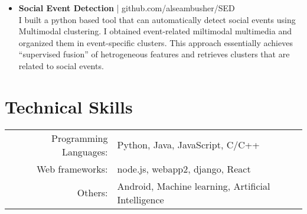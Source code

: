 \documentclass{article} %
\begin{document}
\begin{itemize}
 \item \textbf{Social Event Detection} | github.com/alseambusher/SED\\ 
 I built a python based tool that can automatically detect social events using Multimodal clustering. I obtained event-related miltimodal multimedia and organized them in event-specific clusters. This approach essentially achieves “supervised fusion” of hetrogeneous features and retrieves clusters that are related to social events.
\end{itemize}


\section{Technical Skills}
\renewcommand{\arraystretch}{1}%
\begin{tabular}{rl}

Programming Languages: &  Python, Java, JavaScript, C/C++ \\
Web frameworks: & node.js, webapp2, django, React\\
Others: & Android, Machine learning, Artificial Intelligence \\
\end{tabular}

\newcommand\textlcsc[1]{\textsc{\MakeTextLowercase{#1}}}
\end{document}
